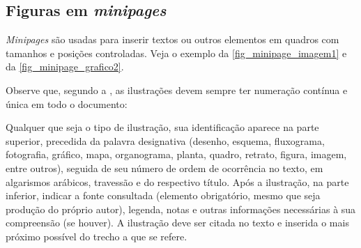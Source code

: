 
\subsection{Figuras em \emph{minipages}}

\emph{Minipages} são usadas para inserir textos ou outros elementos em quadros
com tamanhos e posições controladas. Veja o exemplo da
\autoref{fig_minipage_imagem1} e da \autoref{fig_minipage_grafico2}.




Observe que, segundo a , as
ilustrações devem sempre ter numeração contínua e única em todo o documento:

\begin{citacao}
Qualquer que seja o tipo de ilustração, sua identificação aparece na parte
superior, precedida da palavra designativa (desenho, esquema, fluxograma,
fotografia, gráfico, mapa, organograma, planta, quadro, retrato, figura,
imagem, entre outros), seguida de seu número de ordem de ocorrência no texto,
em algarismos arábicos, travessão e do respectivo título. Após a ilustração, na
parte inferior, indicar a fonte consultada (elemento obrigatório, mesmo que
seja produção do próprio autor), legenda, notas e outras informações
necessárias à sua compreensão (se houver). A ilustração deve ser citada no
texto e inserida o mais próximo possível do trecho a que se
refere. \cite[seções 5.8]{NBR14724:2011}
\end{citacao}

